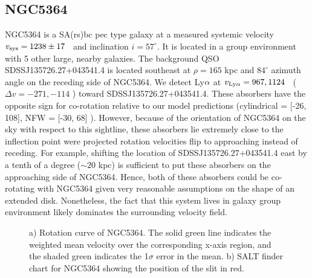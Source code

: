 \subsection{NGC5364}
NGC5364 is a SA(rs)bc pec type galaxy at a measured systemic velocity $v_{\rm sys} = 1238 \pm 17$ \kms~and inclination $i = 57^{\circ}$. It is located in a group environment with 5 other large, nearby galaxies. The background QSO SDSSJ135726.27+043541.4 is located southeast at $\rho = 165$ kpc and $84^{\circ}$ azimuth angle on the receding side of NGC5364. We detect Ly$\rm \alpha$ at $v_{\rm Ly\alpha} = 967, 1124$ \kms~($\Delta v = -271, -114$ \kms) toward SDSSJ135726.27+043541.4. These absorbers have the opposite sign for co-rotation relative to our model predictions (cylindrical = [-26, 108], NFW = [-30, 68] \kms). However, because of the orientation of NGC5364 on the sky with respect to this sightline, these absorbers lie extremely close to the inflection point were projected rotation velocities flip to approaching instead of receding. For example, shifting the location of SDSSJ135726.27+043541.4 east by a tenth of a degree ($\sim 20$ kpc) is sufficient to put these absorbers on the approaching side of NGC5364. Hence, both of these absorbers could be co-rotating with NGC5364 given very reasonable assumptions on the shape of an extended disk. Nonetheless, the fact that this system lives in galaxy group environment likely dominates the surrounding velocity field.
\begin{figure}[ht!]
\centering
  \caption{\small{a) Rotation curve of NGC5364. The solid green line indicates the weighted mean velocity over the corresponding x-axis region, and the shaded green indicates the 1$\sigma$ error in the mean. b) SALT finder chart for NGC5364 showing the position of the slit in red.}}
\vspace{0pt}
\end{figure}


